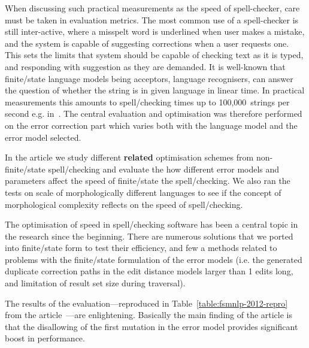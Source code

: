 \documentclass[officiallayout]{unihelcompling}
\begin{document}
When discussing such practical measurements as the speed of spell-checker, care
must be taken in evaluation metrics. The most common use of a spell-checker is
still inter-active, where a misspelt word is underlined when user makes a
mistake, and the system is capable of suggesting corrections when a user
requests one. This sets the limits that system should be capable of checking
text as it is typed, and responding with suggestion as they are demanded. It is
well-known that finite\-/state language models being acceptors,
language recognisers, can answer the question of whether the string is in given
language in linear time. In practical measurements this amounts to
spell\-/checking times up to 100,000~strings per second e.g.
in~\citet{silfverberg2009hfst}. The central evaluation and optimisation was
therefore performed on the error correction part which varies both with the
language model and the error model selected.

In the article we study different \textbf{related} optimisation schemes from
non-finite\-/state spell\-/checking and evaluate the how different error models and
parameters affect the speed of finite\-/state the spell\-/checking. We also ran the
tests on scale of morphologically different languages to see if the concept of
morphological complexity reflects on the speed of spell\-/checking.

The optimisation of speed in spell\-/checking software has been a central
topic in the research since the beginning. There are numerous solutions that we
ported into finite\-/state form to test their efficiency, and few a methods
related to problems with the finite\-/state formulation of the error models (i.e.
the generated duplicate correction paths in the edit distance models larger
than 1 edits long, and limitation of result set size during traversal).

The results of the evaluation---reproduced in
Table~\ref{table:fsmnlp-2012-repro} from the
article~---are enlightening. Basically the main
finding of the article is that the disallowing of the first mutation in the
error model provides significant boost in performance.
\end{document}
